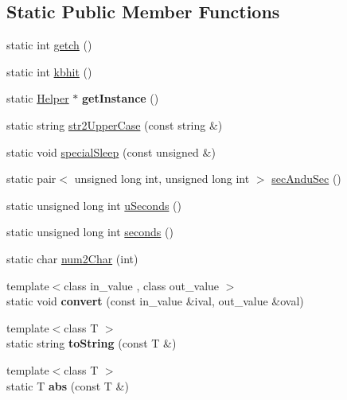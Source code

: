 \subsection*{Static Public Member Functions}
\begin{DoxyCompactItemize}
\item 
static int \hyperlink{classHelper_af310a6096bddd62349e079a38c1cb262}{getch} ()
\item 
static int \hyperlink{classHelper_a5e455435fde35e17e92eb5c86da160d5}{kbhit} ()
\item 
\hypertarget{classHelper_ac7160341c7c6466495a85cfb3025e2f2}{
static \hyperlink{classHelper}{Helper} $\ast$ {\bfseries getInstance} ()}
\label{classHelper_ac7160341c7c6466495a85cfb3025e2f2}

\item 
static string \hyperlink{classHelper_ae07f060871ece1f065a82afa201e779b}{str2UpperCase} (const string \&)
\item 
static void \hyperlink{classHelper_a213de41335d301f71a2e717777caa89b}{specialSleep} (const unsigned \&)
\item 
static pair$<$ unsigned long int, unsigned long int $>$ \hyperlink{classHelper_a39ef263c9231d047476673cef6830967}{secAnduSec} ()
\item 
static unsigned long int \hyperlink{classHelper_ae66525ac48753d71d802b053cd9d4178}{uSeconds} ()
\item 
static unsigned long int \hyperlink{classHelper_a651de62f9290759d729df28b9f1d6c89}{seconds} ()
\item 
static char \hyperlink{classHelper_a31345c5b0d3a2ab7f8b58d9f97b8657e}{num2Char} (int)
\item 
\hypertarget{classHelper_aaf0a9b9f1c768acbd4d7e4764ca406fb}{
{\footnotesize template$<$class in\_\-value , class out\_\-value $>$ }\\static void {\bfseries convert} (const in\_\-value \&ival, out\_\-value \&oval)}
\label{classHelper_aaf0a9b9f1c768acbd4d7e4764ca406fb}

\item 
\hypertarget{classHelper_aee280f3720c7185da3a1396fcc45c3d3}{
{\footnotesize template$<$class T $>$ }\\static string {\bfseries toString} (const T \&)}
\label{classHelper_aee280f3720c7185da3a1396fcc45c3d3}

\item 
\hypertarget{classHelper_aa7776f5e90177a8bd03ee4f1ee43384f}{
{\footnotesize template$<$class T $>$ }\\static T {\bfseries abs} (const T \&)}
\label{classHelper_aa7776f5e90177a8bd03ee4f1ee43384f}


\end{DoxyCompactItemize}
